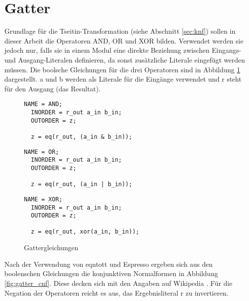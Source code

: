 \section{Gatter}
\label{sec:knf:gatter}

Grundlage für die Tseitin-Transformation (siehe Abschnitt \ref{sec:knf}) sollen in dieser Arbeit die Operatoren AND, OR und XOR bilden. Verwendet werden sie jedoch
nur, falls sie in einem Modul eine direkte Beziehung zwischen Eingangs- und Ausgang-Literalen definieren, da sonst zusätzliche Literale eingefügt werden müssen.
Die boolsche Gleichungen für die drei Operatoren sind in Abbildung \ref{fig:gatter_equations} dargestellt. a und b werden als Literale für die Eingänge verwendet
und r steht für den Ausgang (das Resultat).

\begin{figure}[!h]
  \centering
  \begin{minipage}[c]{4.85cm}
    \begin{lstlisting}[]
  NAME = AND;
  INORDER = r_out a_in b_in;
  OUTORDER = z;

  z = eq(r_out, (a_in & b_in));
    \end{lstlisting}
  \end{minipage}
  \begin{minipage}[c]{4.85cm}
    \begin{lstlisting}[]
  NAME = OR;
  INORDER = r_out a_in b_in;
  OUTORDER = z;

  z = eq(r_out, (a_in | b_in));
    \end{lstlisting}
  \end{minipage}
  \begin{minipage}[c]{5.1cm}
    \begin{lstlisting}[]
  NAME = XOR;
  INORDER = r_out a_in b_in;
  OUTORDER = z;

  z = eq(r_out, xor(a_in, b_in));
    \end{lstlisting}
  \end{minipage}
  \caption{Gattergleichungen}
  \label{fig:gatter_equations}
\end{figure}

Nach der Verwendung von eqntott und Espresso ergeben sich aus den boolenschen Gleichungen die konjunktiven Normalformen in Abbildung \ref{fig:gatter_cnf}.
Diese decken sich mit den Angaben auf Wikipedia \cite{wiki:tseitin}. Für die Negation der Operatoren reicht es aus, das Ergebnisliteral r zu invertieren.

